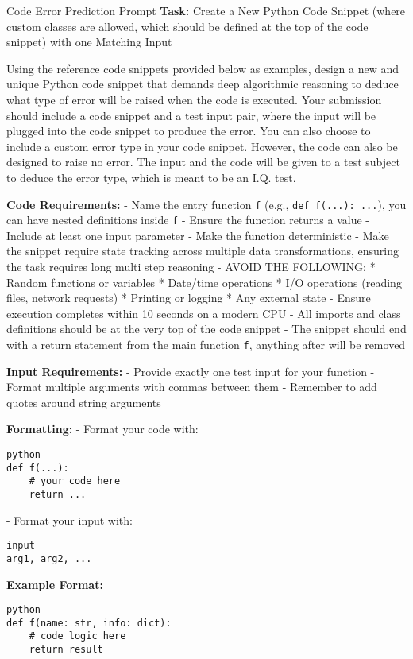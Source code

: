 \documentclass[10pt,a4paper]{article}
\begin{document}
\begin{promptbox}{Code Error Prediction Prompt}
\footnotesize
\textbf{Task:} Create a New Python Code Snippet (where custom classes are allowed, which should be defined at the top of the code snippet) with one Matching Input

Using the reference code snippets provided below as examples, design a new and unique Python code snippet that demands deep algorithmic reasoning to deduce what type of error will be raised when the code is executed. Your submission should include a code snippet and a test input pair, where the input will be plugged into the code snippet to produce the error. You can also choose to include a custom error type in your code snippet. However, the code can also be designed to raise no error. The input and the code will be given to a test subject to deduce the error type, which is meant to be an I.Q. test.

\textbf{Code Requirements:}
- Name the entry function \texttt{f} (e.g., \texttt{def f(...): ...}), you can have nested definitions inside \texttt{f}
- Ensure the function returns a value
- Include at least one input parameter
- Make the function deterministic
- Make the snippet require state tracking across multiple data transformations, ensuring the task requires long multi step reasoning
- AVOID THE FOLLOWING:
  * Random functions or variables
  * Date/time operations
  * I/O operations (reading files, network requests)
  * Printing or logging
  * Any external state
- Ensure execution completes within 10 seconds on a modern CPU
- All imports and class definitions should be at the very top of the code snippet
- The snippet should end with a return statement from the main function \texttt{f}, anything after will be removed

\textbf{Input Requirements:}
- Provide exactly one test input for your function
- Format multiple arguments with commas between them
- Remember to add quotes around string arguments

\textbf{Formatting:}
- Format your code with:
\begin{verbatim}python
def f(...):
    # your code here
    return ...
\end{verbatim}
- Format your input with:
\begin{verbatim}input
arg1, arg2, ...
\end{verbatim}

\textbf{Example Format:}
\begin{verbatim}python
def f(name: str, info: dict):
    # code logic here
    return result
\end{verbatim}


\end{promptbox}
\end{document}
